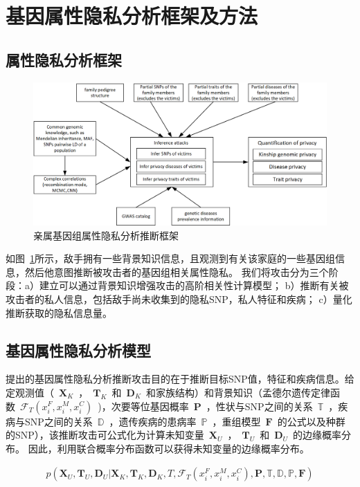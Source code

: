 \section{基因属性隐私分析框架及方法}
\label{sec:inference-attack}

\subsection{属性隐私分析框架}

\begin{figure}[htbp]
	\centering
	\includegraphics[width=0.95\linewidth]{./figures/attack-framework.png}
	\centering
	\caption{亲属基因组属性隐私分析推断框架}\label{fig:attack-framework}
\end{figure}

如图~\ref{fig:attack-framework}所示，敌手拥有一些背景知识信息，且观测到有关该家庭的一些基因组信息，然后他意图推断被攻击者的基因组相关属性隐私。 我们将攻击分为三个阶段：a）建立可以通过背景知识增强攻击的高阶相关性计算模型； b）推断有关被攻击者的私人信息，包括敌手尚未收集到的隐私SNP，私人特征和疾病； c）量化推断获取的隐私信息量。

\subsection{基因属性隐私分析模型}
提出的基因属性隐私分析推断攻击目的在于推断目标SNP值，特征和疾病信息。给定观测值（~$\mathbf{X}_K$~，~$\mathbf{T}_K$~和~$\mathbf{D}_K$~和家族结构）和背景知识（孟德尔遗传定律函数~$\mathcal{F}_T(x_i^F,x_i^M,x_i^C)$~)，次要等位基因概率~$\mathbf{P}$~，性状与SNP之间的关系~$\mathbb{T}$~，疾病与SNP之间的关系~$\mathbb{D}$~，遗传疾病的患病率~$\mathbb{P}$~，重组模型~$\mathbf{F}$~的公式以及种群的SNP），该推断攻击可公式化为计算未知变量~$\mathbf{X}_U$~，~$\mathbf{T}_U$~和~$\mathbf{D}_U$~的边缘概率分布。
因此，利用联合概率分布函数可以获得未知变量的边缘概率分布。

\begin{equation}\label{eq:joint-pro}
\begin{aligned}
p(\mathbf{X}_U, \mathbf{T}_U, \mathbf{D}_U | \mathbf{X}_K, \mathbf{T}_K, \mathbf{D}_K, T, \mathcal{F}_T(x_i^F,x_i^M,x_i^C), \mathbf{P}, \mathbb{T}, \mathbb{D}, \mathbb{P}, \mathbf{F})
\end{aligned}
\end{equation}

